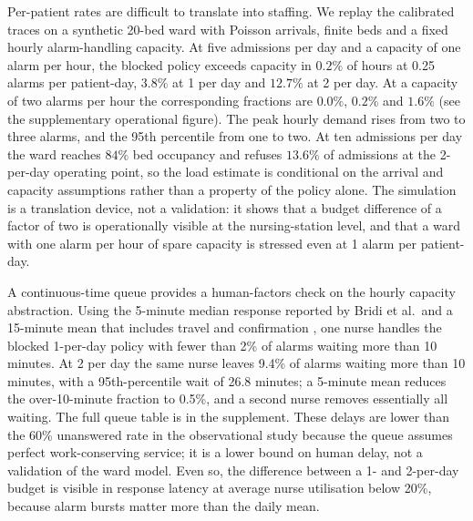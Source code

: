 Per-patient rates are difficult to translate into staffing. We replay the calibrated traces on a synthetic 20-bed ward with Poisson arrivals, finite beds and a fixed hourly alarm-handling capacity. At five admissions per day and a capacity of one alarm per hour, the blocked policy exceeds capacity in $0.2\%$ of hours at 0.25 alarms per patient-day, $3.8\%$ at 1 per day and $12.7\%$ at 2 per day. At a capacity of two alarms per hour the corresponding fractions are $0.0\%$, $0.2\%$ and $1.6\%$ (see the supplementary operational figure). The peak hourly demand rises from two to three alarms, and the 95th percentile from one to two. At ten admissions per day the ward reaches $84\%$ bed occupancy and refuses $13.6\%$ of admissions at the 2-per-day operating point, so the load estimate is conditional on the arrival and capacity assumptions rather than a property of the policy alone. The simulation is a translation device, not a validation: it shows that a budget difference of a factor of two is operationally visible at the nursing-station level, and that a ward with one alarm per hour of spare capacity is stressed even at 1 alarm per patient-day.


A continuous-time queue provides a human-factors check on the hourly capacity abstraction. Using the 5-minute median response reported by Bridi et al.\ and a 15-minute mean that includes travel and confirmation \citep{bridi2014reaction}, one nurse handles the blocked 1-per-day policy with fewer than 2\% of alarms waiting more than 10 minutes. At 2 per day the same nurse leaves 9.4\% of alarms waiting more than 10 minutes, with a 95th-percentile wait of 26.8 minutes; a 5-minute mean reduces the over-10-minute fraction to 0.5\%, and a second nurse removes essentially all waiting. The full queue table is in the supplement. These delays are lower than the 60\% unanswered rate in the observational study because the queue assumes perfect work-conserving service; it is a lower bound on human delay, not a validation of the ward model. Even so, the difference between a 1- and 2-per-day budget is visible in response latency at average nurse utilisation below 20\%, because alarm bursts matter more than the daily mean.
